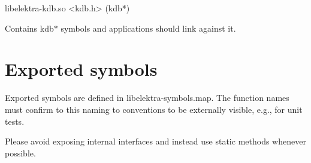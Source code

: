 \begin{DoxyVerb}libelektra-kdb.so
<kdb.h> (kdb*)
\end{DoxyVerb}


Contains kdb$\ast$ symbols and applications should link against it.

\section*{Exported symbols}

Exported symbols are defined in libelektra-\/symbols.map. The function names must confirm to this naming to conventions to be externally visible, e.\+g., for unit tests.

Please avoid exposing internal interfaces and instead use {\ttfamily static} methods whenever possible. 